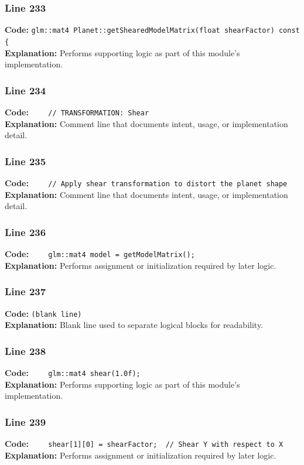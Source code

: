 \documentclass[11pt,a4paper]{article}
\begin{document}
\subsubsection*{Line 233}
\textbf{Code:} \verb|glm::mat4 Planet::getShearedModelMatrix(float shearFactor) const {|\\
\textbf{Explanation:} Performs supporting logic as part of this module's implementation.

\subsubsection*{Line 234}
\textbf{Code:} \verb|    // TRANSFORMATION: Shear|\\
\textbf{Explanation:} Comment line that documents intent, usage, or implementation detail.

\subsubsection*{Line 235}
\textbf{Code:} \verb|    // Apply shear transformation to distort the planet shape|\\
\textbf{Explanation:} Comment line that documents intent, usage, or implementation detail.

\subsubsection*{Line 236}
\textbf{Code:} \verb|    glm::mat4 model = getModelMatrix();|\\
\textbf{Explanation:} Performs assignment or initialization required by later logic.

\subsubsection*{Line 237}
\textbf{Code:} \texttt{(blank line)}\\
\textbf{Explanation:} Blank line used to separate logical blocks for readability.

\subsubsection*{Line 238}
\textbf{Code:} \verb|    glm::mat4 shear(1.0f);|\\
\textbf{Explanation:} Performs supporting logic as part of this module's implementation.

\subsubsection*{Line 239}
\textbf{Code:} \verb|    shear[1][0] = shearFactor;  // Shear Y with respect to X|\\
\textbf{Explanation:} Performs assignment or initialization required by later logic.
\end{document}
